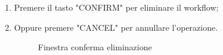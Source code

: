 \begin{enumerate}
	\begin{enumerate}
		\item Premere il tasto "CONFIRM" per eliminare il workflow;
		\item Oppure premere "CANCEL" per annullare l'operazione.
		\begin{figure}[!ht]
			\centering
			\caption{Finestra conferma eliminazione}
		\end{figure}
	\end{enumerate}
	\begin{figure}[!ht]
		\centering

\end{figure}
\end{enumerate}
